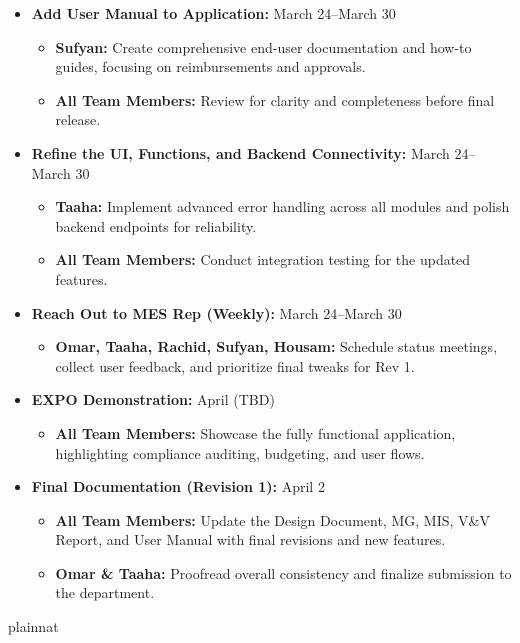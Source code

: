 \documentclass[12pt, titlepage]{article}
\begin{document}
\begin{itemize}
  \item \textbf{Add User Manual to Application:} March 24--March 30 
  \begin{itemize}
    \item \textbf{Sufyan:} Create comprehensive end-user documentation and how-to guides, focusing on reimbursements and approvals.
    \item \textbf{All Team Members:} Review for clarity and completeness before final release.
  \end{itemize}
  
  \item \textbf{Refine the UI, Functions, and Backend Connectivity:} March 24--March 30 
  \begin{itemize}
    \item \textbf{Taaha:} Implement advanced error handling across all modules and polish backend endpoints for reliability.
    \item \textbf{All Team Members:} Conduct integration testing for the updated features.
  \end{itemize}
  
  \item \textbf{Reach Out to MES Rep (Weekly):} March 24--March 30 
  \begin{itemize}
    \item \textbf{Omar, Taaha, Rachid, Sufyan, Housam:} Schedule status meetings, collect user feedback, and prioritize final tweaks for Rev 1.
  \end{itemize}
  
  \item \textbf{EXPO Demonstration:} April (TBD) 
  \begin{itemize}
    \item \textbf{All Team Members:} Showcase the fully functional application, highlighting compliance auditing, budgeting, and user flows.
  \end{itemize}

  \item \textbf{Final Documentation (Revision 1):} April 2 
  \begin{itemize}
    \item \textbf{All Team Members:} Update the Design Document, MG, MIS, V\&V Report, and User Manual with final revisions and new features.
    \item \textbf{Omar \& Taaha:} Proofread overall consistency and finalize submission to the department.
  \end{itemize}
\end{itemize}


 {plainnat}


\newpage{}
\end{document}
